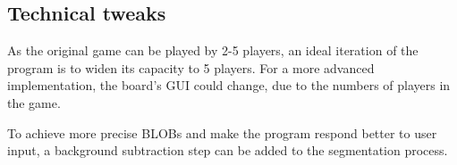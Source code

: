 \subsection{Technical tweaks}
As the original game can be played by 2-5 players, an ideal iteration of the program is to widen its capacity to 5 players. For a more advanced implementation, the board's GUI could change, due to the numbers of players in the game.

To achieve more precise BLOBs and make the program respond better to user input, a background subtraction step can be added to the segmentation process.